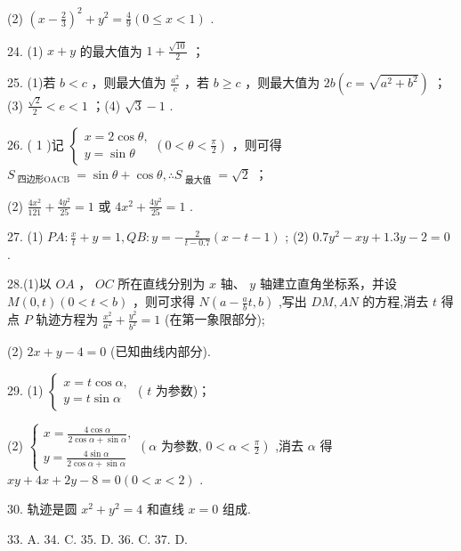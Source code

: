 \documentclass[10pt]{article}
\begin{document}
(2) \({\left( x - \frac{2}{3}\right) }^{2} + {y}^{2} = \frac{4}{9}\left( {0 \leq  x < 1}\right)\) .

24. (1) \(x + y\) 的最大值为 \(1 + \frac{\sqrt{10}}{2}\) ；

25. (1)若 \(b < c\) ，则最大值为 \(\frac{{a}^{2}}{c}\) ，若 \(b \geq  c\) ，则最大值为 \({2b}\left( {c = \sqrt{{a}^{2} + {b}^{2}}}\right)\) ；(3) \(\frac{\sqrt{2}}{2} < e < 1\) ；(4) \(\sqrt{3} - 1\) .

26. ( 1 )记 \(\left\{  {\begin{array}{l} x = 2\cos \theta , \\  y = \sin \theta  \end{array}\left( {0 < \theta  < \frac{\pi }{2}}\right) }\right.\) ，则可得 \({S}_{\text{ 四边形OACB }} = \sin \theta  + \cos \theta ,\therefore {S}_{\text{ 最大值 }} = \sqrt{2}\) ；

(2) \(\frac{4{x}^{2}}{121} + \frac{4{y}^{2}}{25} = 1\) 或 \(4{x}^{2} + \frac{4{y}^{2}}{25} = 1\) .

27. (1) \({PA} : \frac{x}{t} + y = 1,{QB} : y =  - \frac{2}{t - {0.7}}\left( {x - t - 1}\right)\) ; (2) \({0.7}{y}^{2} - {xy} + {1.3y} - 2 = 0\) .

28.(1)以 \({OA}\) ， \({OC}\) 所在直线分别为 \(x\) 轴、 \(y\) 轴建立直角坐标系，并设 \(M\left( {0,t}\right) \left( {0 < t < b}\right)\) ，则可求得 \(N\left( {a - \frac{a}{b}t,b}\right)\) ,写出 \({DM},{AN}\) 的方程,消去 \(t\) 得点 \(P\) 轨迹方程为 \(\frac{{x}^{2}}{{a}^{2}} + \frac{{y}^{2}}{{b}^{2}} = 1\) (在第一象限部分);

(2) \({2x} + y - 4 = 0\) (已知曲线内部分).

29. (1) \(\left\{  \begin{array}{l} x = t\cos \alpha , \\  y = t\sin \alpha  \end{array}\right.\) ( \(t\) 为参数)；

(2) \(\left\{  {\begin{array}{l} x = \frac{4\cos \alpha }{2\cos \alpha  + \sin \alpha }, \\  y = \frac{4\sin \alpha }{2\cos \alpha  + \sin \alpha } \end{array}\left( {\alpha \text{ 为参数, }0 < \alpha  < \frac{\pi }{2}}\right) }\right.\) ,消去 \(\alpha\) 得 \({xy} + {4x} + {2y} - 8 = 0\left( {0 < x < 2}\right)\) .

30. 轨迹是圆 \({x}^{2} + {y}^{2} = 4\) 和直线 \(x = 0\) 组成.

33. A. 34. C. 35. D. 36. C. 37. D.
\end{document}
